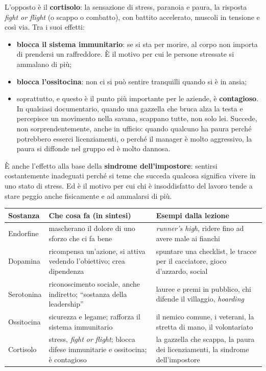 L'opposto è il \textbf{cortisolo}: la sensazione di stress, paranoia e paura, la risposta
\emph{fight or flight} (o scappo o combatto), con battito accelerato, muscoli in tensione e così
via. Tra i suoi effetti:
\begin{itemize}
  \item \textbf{blocca il sistema immunitario}: se si sta per morire, al corpo non importa di
        prendersi un raffreddore. È il motivo per cui le persone stressate si ammalano di più;
  \item \textbf{blocca l'ossitocina}: non ci si può sentire tranquilli quando si è in ansia;
  \item soprattutto, e questo è il punto più importante per le aziende, è
        \textbf{contagioso}. In qualsiasi documentario, quando una gazzella che bruca alza la
        testa e percepisce un movimento nella savana, scappano tutte, non solo lei. Succede,
        non sorprendentemente, anche in ufficio: quando qualcuno ha paura perché potrebbero
        esserci licenziamenti, o perché il manager è molto aggressivo, la paura si diffonde nel
        gruppo ed è molto dannosa.
\end{itemize}
È anche l'effetto alla base della \textbf{sindrome dell'impostore}: sentirsi costantemente
inadeguati perché si teme che succeda qualcosa significa vivere in uno stato di stress. Ed è il
motivo per cui chi è insoddisfatto del lavoro tende a stare peggio anche fisicamente e ad
ammalarsi di più.

\begin{center}
  \begin{tabular}{@{}p{}p{}p{}@{}}
    \toprule
    \textbf{Sostanza} & \textbf{Che cosa fa (in sintesi)} & \textbf{Esempi dalla lezione} \\
    \midrule
    Endorfine & mascherano il dolore di uno sforzo che ci fa bene &
      \emph{runner's high}, ridere fino ad avere male ai fianchi \\
    \addlinespace
    Dopamina & ricompensa un'azione, si attiva vedendo l'obiettivo; crea dipendenza &
      spuntare una checklist, le tracce per il cacciatore, gioco d'azzardo, social \\
    \addlinespace
    Serotonina & riconoscimento sociale, anche indiretto; ``sostanza della leadership'' &
      lauree e premi in pubblico, chi difende il villaggio, \emph{hoarding} \\
    \addlinespace
    Ossitocina & sicurezza e legame; rafforza il sistema immunitario &
      il nemico comune, i veterani, la stretta di mano, il volontariato \\
    \addlinespace
    Cortisolo & stress, \emph{fight or flight}; blocca difese immunitarie e ossitocina; è
      contagioso & la gazzella che scappa, la paura dei licenziamenti, la sindrome
      dell'impostore \\
    \bottomrule
  \end{tabular}
\end{center}

